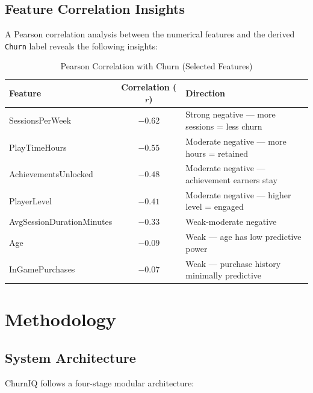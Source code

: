 \documentclass[12pt, a4paper]{article}
\begin{document}
\subsection{Feature Correlation Insights}

A Pearson correlation analysis between the numerical features and the
derived \texttt{Churn} label reveals the following insights:

\begin{table}[H]
\centering
\caption{Pearson Correlation with Churn (Selected Features)}
\label{tab:corr}
\renewcommand{\arraystretch}{1.25}
\begin{tabular}{l c l}
\toprule
\textbf{Feature} & \textbf{Correlation ($r$)} & \textbf{Direction} \\
\midrule
SessionsPerWeek            & $-0.62$ & Strong negative — more sessions = less churn \\
PlayTimeHours              & $-0.55$ & Moderate negative — more hours = retained \\
AchievementsUnlocked       & $-0.48$ & Moderate negative — achievement earners stay \\
PlayerLevel                & $-0.41$ & Moderate negative — higher level = engaged \\
AvgSessionDurationMinutes  & $-0.33$ & Weak-moderate negative \\
Age                        & $-0.09$ & Weak — age has low predictive power \\
InGamePurchases            & $-0.07$ & Weak — purchase history minimally predictive \\
\bottomrule
\end{tabular}
\end{table}

\section{Methodology}

\subsection{System Architecture}

ChurnIQ follows a four-stage modular architecture:
\end{document}
